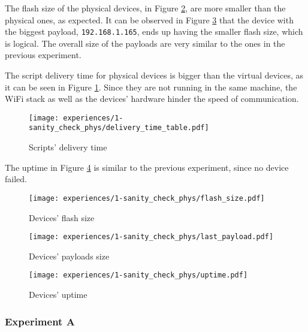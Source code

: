 The flash size  of the physical devices, in Figure \ref{fig:sanity_check_phys_flash_size}, are more smaller than the physical ones, as expected. It can be observed in Figure \ref{fig:sanity_check_phys_last_payload} that the device with the biggest payload, \texttt{192.168.1.165}, ends up having the smaller flash size, which is logical. The overall size of the payloads are very similar to the ones in the previous experiment. 

The script delivery time for physical devices is bigger than the virtual devices, as it can be seen in Figure \ref{fig:sanity_check_phys_script_delivery_time}. Since they are not running in the same machine, the WiFi stack as well as the devices' hardware hinder the speed of communication.

\begin{figure}[h]
\centering
\texttt{[image: experiences/1-sanity\_check\_phys/delivery\_time\_table.pdf]}
\caption[Scripts' delivery time]{Scripts' delivery time}\label{fig:sanity_check_phys_script_delivery_time}
\end{figure}

The uptime in Figure \ref{fig:sanity_check_phys_uptime} is similar to the previous experiment, since no device failed.

\begin{figure}[H]
\centering
\texttt{[image: experiences/1-sanity\_check\_phys/flash\_size.pdf]}
\caption[Devices' flash size]{Devices' flash size}\label{fig:sanity_check_phys_flash_size}
\end{figure}

\begin{figure}[h]
\centering
\texttt{[image: experiences/1-sanity\_check\_phys/last\_payload.pdf]}
\caption[Devices' payloads size]{Devices' payloads size}\label{fig:sanity_check_phys_last_payload}
\end{figure}

\begin{figure}[H]
\centering
\texttt{[image: experiences/1-sanity\_check\_phys/uptime.pdf]}
\caption[Devices' uptime]{Devices' uptime}\label{fig:sanity_check_phys_uptime}
\end{figure}


\subsubsection{Experiment A}

